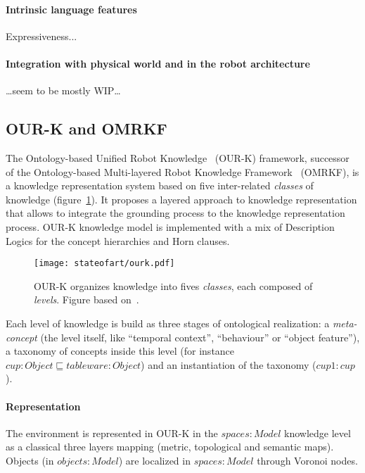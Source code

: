 \paragraph{Intrinsic language features}
\label{sect|nkrl-intrinsic-features}

Expressiveness...

\paragraph{Integration with physical world and in the robot architecture}
\label{sect|nkrl-integration}

\ldots seem to be mostly WIP\ldots

\subsection{OUR-K and OMRKF}
\label{sect|omrkf}

The Ontology-based Unified Robot Knowledge~\cite{Lim2011} (OUR-K) framework,
successor of the Ontology-based Multi-layered Robot Knowledge
Framework~\cite{Suh2007} (OMRKF), is a knowledge representation system based on
five inter-related \emph{classes} of knowledge (figure~\ref{fig|omrkf}). It
proposes a layered approach to knowledge representation that allows to
integrate the grounding process to the knowledge representation process. OUR-K
knowledge model is implemented with a mix of Description Logics for the concept
hierarchies and Horn clauses.

\begin{figure}
    \centering
    \texttt{[image: stateofart/ourk.pdf]}

    \caption{OUR-K organizes knowledge into fives \emph{classes}, each composed
    of \emph{levels}. Figure based on~\cite{Lim2011}.}

    \label{fig|omrkf}
\end{figure}

Each level of knowledge is build as three stages of ontological realization: a
\emph{meta-concept} (the level itself, like ``temporal context'', ``behaviour''
or ``object feature''), a taxonomy of concepts inside this level (for instance
$cup : Object \sqsubseteq tableware : Object$) and an instantiation of the
taxonomy ($cup1 : cup$).

\paragraph{Representation} The environment is represented in OUR-K in the
$spaces : Model$ knowledge level as a classical three layers mapping (metric,
topological and semantic maps). Objects (in $objects : Model$) are localized in
$spaces : Model$ through Voronoi nodes.

